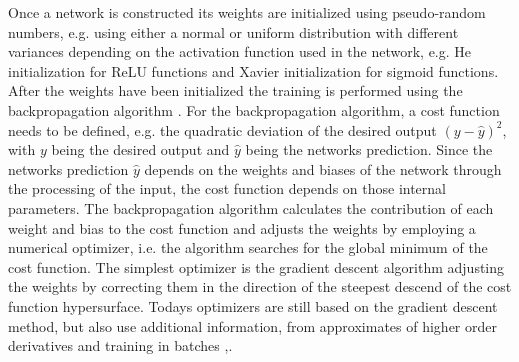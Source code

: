 Once a network is constructed its weights are initialized using pseudo-random numbers, e.g. using either a normal or uniform distribution with different variances depending on the activation function used in the network, e.g. He initialization \cite{He2015} for ReLU functions and Xavier initialization \cite{Glorot2010} for sigmoid functions. After the weights have been initialized the training is performed using the backpropagation algorithm \cite{Rumelhart1986}. For the backpropagation algorithm, a cost function needs to be defined, e.g. the quadratic deviation of the desired output $(y-\hat{y})^2$, with $y$ being the desired output and $\hat{y}$ being the networks prediction. Since the networks prediction $\hat{y}$ depends on the weights and biases of the network through the processing of the input, the cost function depends on those internal parameters. The backpropagation algorithm calculates the contribution of each weight and bias to the cost function and adjusts the weights by employing a numerical optimizer, i.e. the algorithm searches for the global minimum of the cost function.  The simplest optimizer is the gradient descent algorithm adjusting the weights by correcting them in the direction of the steepest descend of the cost function hypersurface. Todays optimizers are still based on the gradient descent method, but also use additional information, from approximates of higher order derivatives and training in batches \cite{Duchi2010},\cite{Sharma2017}. \\


